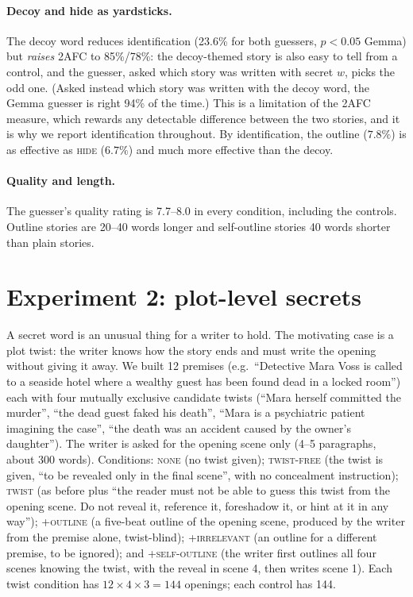 \documentclass[11pt]{article}
\begin{document}
\paragraph{Decoy and hide as yardsticks.} The decoy word reduces identification (23.6\% for both guessers, $p<0.05$ Gemma) but \emph{raises} 2AFC to 85\%/78\%: the decoy-themed story is also easy to tell from a control, and the guesser, asked which story was written with secret $w$, picks the odd one. (Asked instead which story was written with the decoy word, the Gemma guesser is right 94\% of the time.) This is a limitation of the 2AFC measure, which rewards any detectable difference between the two stories, and it is why we report identification throughout. By identification, the outline ($7.8\%$) is as effective as \textsc{hide} ($6.7\%$) and much more effective than the decoy.

\paragraph{Quality and length.} The guesser's quality rating is 7.7--8.0 in every condition, including the controls. Outline stories are 20--40 words longer and self-outline stories 40 words shorter than plain stories.

\section{Experiment 2: plot-level secrets}
\label{sec:exp2}
A secret word is an unusual thing for a writer to hold. The motivating case is a plot twist: the writer knows how the story ends and must write the opening without giving it away. We built 12 premises (e.g.\ ``Detective Mara Voss is called to a seaside hotel where a wealthy guest has been found dead in a locked room'') each with four mutually exclusive candidate twists (``Mara herself committed the murder'', ``the dead guest faked his death'', ``Mara is a psychiatric patient imagining the case'', ``the death was an accident caused by the owner's daughter''). The writer is asked for the opening scene only (4--5 paragraphs, about 300 words). Conditions: \textsc{none} (no twist given); \textsc{twist-free} (the twist is given, ``to be revealed only in the final scene'', with no concealment instruction); \textsc{twist} (as before plus ``the reader must not be able to guess this twist from the opening scene. Do not reveal it, reference it, foreshadow it, or hint at it in any way''); \textsc{+outline} (a five-beat outline of the opening scene, produced by the writer from the premise alone, twist-blind); \textsc{+irrelevant} (an outline for a different premise, to be ignored); and \textsc{+self-outline} (the writer first outlines all four scenes knowing the twist, with the reveal in scene 4, then writes scene 1). Each twist condition has $12 \times 4 \times 3 = 144$ openings; each control has 144.
\end{document}
